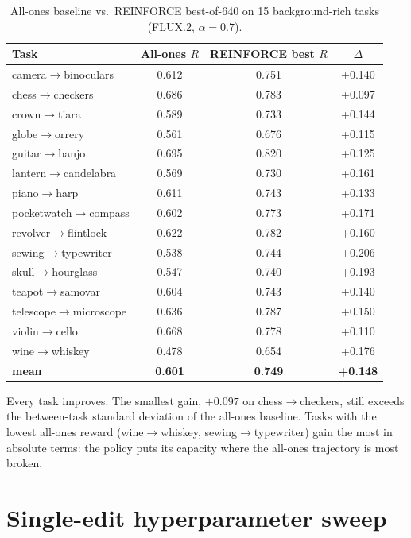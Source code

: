 \begin{table}[H]
    \centering
    \caption{All-ones baseline vs.\ REINFORCE best-of-640 on 15 background-rich tasks (FLUX.2, $\alpha=0.7$).}
    \begin{tabular}{lccc}
    \toprule
    Task & All-ones $R$ & REINFORCE best $R$ & $\Delta$ \\
    \midrule
    camera$\to$binoculars       & 0.612 & 0.751 & +0.140 \\
    chess$\to$checkers          & 0.686 & 0.783 & +0.097 \\
    crown$\to$tiara             & 0.589 & 0.733 & +0.144 \\
    globe$\to$orrery            & 0.561 & 0.676 & +0.115 \\
    guitar$\to$banjo            & 0.695 & 0.820 & +0.125 \\
    lantern$\to$candelabra      & 0.569 & 0.730 & +0.161 \\
    piano$\to$harp              & 0.611 & 0.743 & +0.133 \\
    pocketwatch$\to$compass     & 0.602 & 0.773 & +0.171 \\
    revolver$\to$flintlock      & 0.622 & 0.782 & +0.160 \\
    sewing$\to$typewriter       & 0.538 & 0.744 & +0.206 \\
    skull$\to$hourglass         & 0.547 & 0.740 & +0.193 \\
    teapot$\to$samovar          & 0.604 & 0.743 & +0.140 \\
    telescope$\to$microscope    & 0.636 & 0.787 & +0.150 \\
    violin$\to$cello            & 0.668 & 0.778 & +0.110 \\
    wine$\to$whiskey            & 0.478 & 0.654 & +0.176 \\
    \midrule
    \textbf{mean}               & \textbf{0.601} & \textbf{0.749} & \textbf{+0.148} \\
    \bottomrule
    \end{tabular}
    \label{tab::new_bgrich_numbers}
\end{table}

Every task improves. The smallest gain, $+0.097$ on chess$\to$checkers, still exceeds the between-task standard deviation of the all-ones baseline. Tasks with the lowest all-ones reward (wine$\to$whiskey, sewing$\to$typewriter) gain the most in absolute terms: the policy puts its capacity where the all-ones trajectory is most broken.

\section{Single-edit hyperparameter sweep}
\label{sec:experiments_sweep}


